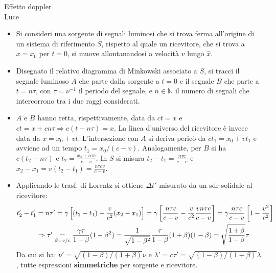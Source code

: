 \documentclass[a4_2,grid,frame]{flashcards}
\newenvironment{cartaflash}
    {\vspace{-15pt}
    \begin{itemize}
    }
    {
    \end{itemize}
    }
\begin{document}
\begin{flashcard}[Effetto]{Effetto doppler\\Luce} %
\begin{cartaflash}
\item Si consideri una sorgente di segnali luminosi che si trova ferma all'origine di un sistema di riferimento $S$, rispetto al quale un ricevitore, che si trova a $x = x_0$ per $t = 0$, si muove allontanandosi a velocità $v$ lungo $\hat{x}$.
\vspace{-7pt}
\item Disegnato il relativo diagramma di Minkowski associato a $S$, si tracci il segnale luminoso $A$ che parte dalla sorgente a $t=0$ e il segnale $B$ che parte a $t = n\tau$, con $\tau = \nu^{-1}$ il periodo del segnale, e $n \in \mathbb{N}$ il numero di segnali che intercorrono tra i due raggi considerati.
\vspace{-7pt}
\item $A$ e $B$ hanno retta, rispettivamente, data da $ct = x$ e $ct = x+cn\tau \Rightarrow c(t-n\tau) = x$. La linea d'universo del ricevitore è invece data da $x = x_0+vt$. L'intersezione con $A$ si deriva pericò da $ct_1 = x_0+vt_1$ e avviene ad un tempo $t_1 = x_0/(c-v)$. Analogamente, per $B$ si ha $c(t_2 - n\tau)$ e $t_2 = \frac{x_0+n\tau c}{c-v}$. In $S$ si misura $t_2-t_1 = \frac{n\tau c}{c-v}$ e $x_2-x_1 = v(t_2-t_1) = \frac{n\tau c v}{c-v}$.
\vspace{-7pt}
\item Applicando le trasf. di Lorentz si ottiene $\Delta t'$ misurato da un sdr solidale al ricevitore:
{
\vspace{-13pt}
\begin{align*}
    t_2' - t_1' &= n\tau' = \gamma \left [(t_2 - t_1) - \frac{v}{c^2}(x_2-x_1) \right ] = \gamma \left [ \frac{n\tau c}{c-v} - \frac{v}{c^2}\frac{vn\tau c}{c-v}\right ] = \gamma\frac{n\tau c}{c-v}\left [ 1-\frac{v^2}{c^2}\right ]\\
&\Rightarrow \tau' \underset{\beta = v/c}{=} \frac{\gamma \tau}{1-\beta}(1-\beta^2) = \frac{1}{\sqrt{1-\beta^2}}\frac{\tau}{1-\beta} (1+\beta)(1-\beta) = \sqrt{\frac{1+\beta}{1-\beta}}\tau 
\vspace{-7pt}
\end{align*}
}
Da cui si ha: $\nu' = \sqrt{(1-\beta)/(1+\beta)}\nu$ e $\lambda' = c\tau' = \sqrt{(1-\beta)/(1+\beta)}\lambda$, tutte espressioni \textbf{simmetriche} per sorgente e ricevitore.
\end{cartaflash}
\end{flashcard}
\end{document}
